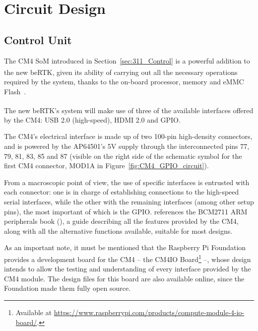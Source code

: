 
\section{Circuit Design}\label{sec:32_Circuit}



\subsection{Control Unit}\label{sec:322_CONTROL}
The CM4 \gls{SoM} introduced in Section~\ref{sec:311_Control} is a powerful addition to the new beRTK\textsuperscript{\textregistered}, given its ability of carrying out all the necessary operations required by the system, thanks to the on-board processor, memory and eMMC Flash~\cite{CM4}.

The new beRTK\textsuperscript{\textregistered}'s system will make use of three of the available interfaces offered by the CM4: USB 2.0 (high-speed), HDMI 2.0 and GPIO.

The CM4's electrical interface is made up of two 100-pin high-density connectors, and is powered by the AP64501's 5V supply through the interconnected pins 77, 79, 81, 83, 85 and 87 (visible on the right side of the schematic symbol for the first CM4 connector, MOD1A in Figure~\ref{fig:CM4_GPIO_circuit}).

From a macroscopic point of view, the use of specific interfaces is entrusted with each connector: one is in charge of establishing connections to the high-speed serial interfaces, while the other with the remaining interfaces (among other setup pins), the most important of which is the GPIO.
\cite{CM4} references the BCM2711 ARM peripherals book (\cite{BCM2711_book}), a guide describing all the features provided by the CM4, along with all the alternative functions available, suitable for most designs.

As an important note, it must be mentioned that the Raspberry Pi Foundation provides a development board for the CM4 -- the CM4IO Board\footnote[15]{Available at \url{https://www.raspberrypi.com/products/compute-module-4-io-board/}.} --, whose design intends to allow the testing and understanding of every interface provided by the CM4 module. The design files for this board are also available online, since the Foundation made them fully open source.

